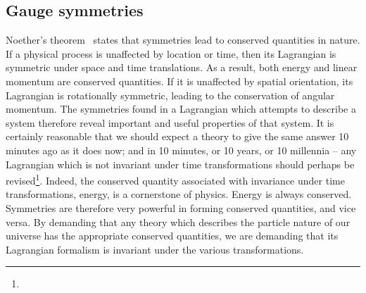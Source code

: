 \subsection{Gauge symmetries \label{th:gauge}}
Noether's theorem~\cite{bib:Noether1918} states that  symmetries lead to conserved quantities in nature.
If a physical process is unaffected by location or time, then its Lagrangian is symmetric under space and time translations.
As a result, both energy and linear momentum are conserved quantities.
If it is unaffected by spatial orientation, its Lagrangian is rotationally symmetric, leading to the conservation of angular momentum.
The symmetries found in a Lagrangian which attempts to describe a system therefore reveal important and useful properties of that system.
It is certainly reasonable that we should expect a theory to give the same answer 10 minutes ago as it does now; and in 10 minutes, or 10 years, or 10 millennia -- any Lagrangian which is not invariant under time transformations should perhaps be revised\footnote{}.
Indeed, the conserved quantity associated with invariance under time transformations, energy, is a cornerstone of physics. 
Energy is always conserved.
Symmetries are therefore very powerful in forming conserved quantities, and vice versa.
By demanding that any theory which describes the particle nature of our universe has the appropriate conserved quantities, we are demanding that its Lagrangian formalism is invariant under the various transformations.

